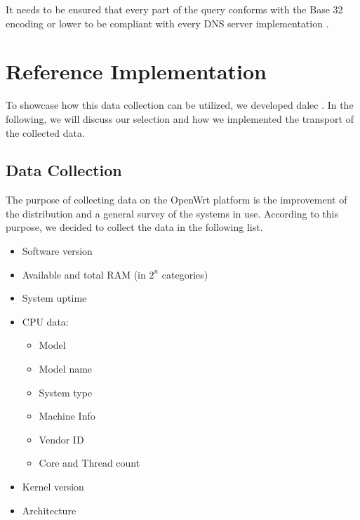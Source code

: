         It needs to be ensured that every part of the query conforms with the Base 32 encoding or lower to be compliant with every DNS server implementation \cite{mockapetris_domain_1987}.

\newpage


\section{Reference Implementation}
\label{sec:software_design:ref_impl}
    To showcase how this data collection can be utilized, we developed dalec \cite{venz_ikstreamdalec_2021}.
    In the following, we will discuss our selection and how we implemented the transport of the collected data.
%
\subsection{Data Collection}
    The purpose of collecting data on the OpenWrt platform is the improvement of the distribution and a general survey of the systems in use. According to this purpose, we decided to collect the data in the following list. 
    \begin{itemize}
        \item Software version
        \item Available and total RAM (in $2^n$ categories)
        \item System uptime
        \item CPU data:
        \begin{itemize}
            \item Model
            \item Model name
            \item System type
            \item Machine Info
            \item Vendor ID
            \item Core and Thread count
        \end{itemize}
        \item Kernel version
        \item Architecture
    \end{itemize}
    
